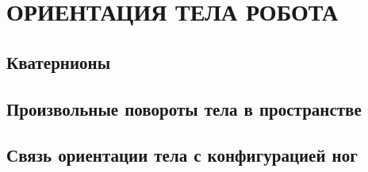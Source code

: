 \chapter{\MakeUppercase{Ориентация тела робота}}
\section{Кватернионы}

\section{Произвольные повороты тела в пространстве}

\section{Связь ориентации тела с конфигурацией ног}